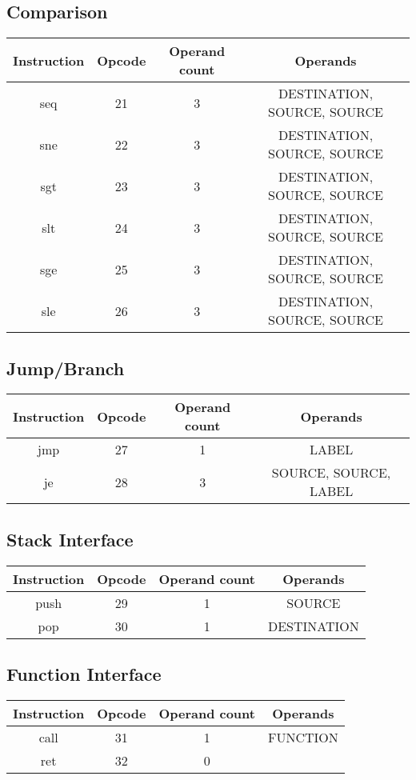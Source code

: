 \documentclass[manuscript,screen,nonacm]{acmart}
\begin{document}
\subsection{Comparison}
\begin{center}
\begin{tabular}{|c|c|c|c|}
    \hline
    Instruction & Opcode & Operand count & Operands \\
    \hline
    seq & 21 & 3 & DESTINATION, SOURCE, SOURCE \\
    sne & 22 & 3 & DESTINATION, SOURCE, SOURCE \\
    sgt & 23 & 3 & DESTINATION, SOURCE, SOURCE \\
    slt & 24 & 3 & DESTINATION, SOURCE, SOURCE \\
    sge & 25 & 3 & DESTINATION, SOURCE, SOURCE \\
    sle & 26 & 3 & DESTINATION, SOURCE, SOURCE \\
    \hline
\end{tabular}
\end{center}

\subsection{Jump/Branch}
\begin{center}
\begin{tabular}{|c|c|c|c|}
    \hline
    Instruction & Opcode & Operand count & Operands \\
    \hline
    jmp & 27 & 1 & LABEL \\
    je & 28 & 3 & SOURCE, SOURCE, LABEL \\
    \hline
\end{tabular}
\end{center}

\subsection{Stack Interface}
\begin{center}
\begin{tabular}{|c|c|c|c|}
    \hline
    Instruction & Opcode & Operand count & Operands \\
    \hline
    push & 29 & 1 & SOURCE \\
    pop & 30 & 1 & DESTINATION \\
    \hline
\end{tabular}
\end{center}

\subsection{Function Interface}
\begin{center}
\begin{tabular}{|c|c|c|c|}
    \hline
    Instruction & Opcode & Operand count & Operands \\
    \hline
    call & 31 & 1 & FUNCTION \\
    ret & 32 & 0 & \\
    \hline
\end{tabular}
\end{center}
\end{document}
